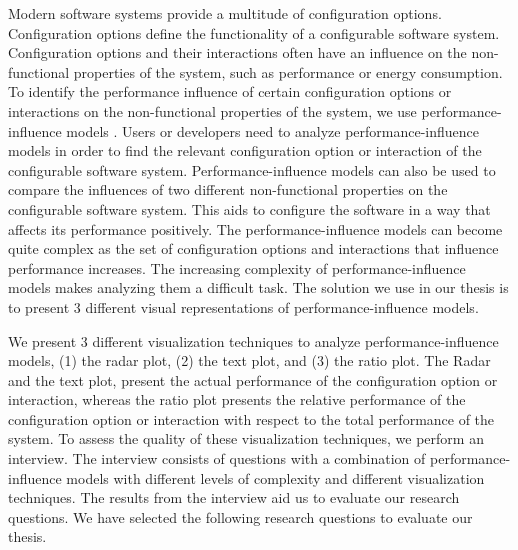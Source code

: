 
Modern software systems provide a multitude of configuration options. Configuration options define the functionality of a configurable software system. Configuration options and their interactions often have an influence on the non-functional properties of the system, such as performance or energy consumption. To identify the performance influence of certain configuration options or interactions on the non-functional properties of the system, we use performance-influence models \cite{DBLP:conf/sigsoft/SiegmundGAK15}. 
Users or developers need to analyze performance-influence models in order to find the relevant configuration option or interaction of the configurable software system. Performance-influence models can also be used to compare the influences of two different non-functional properties on the configurable software system. This aids to configure the software in a way that affects its performance positively. The performance-influence models can become quite complex as the set of configuration options and interactions that influence performance increases. The increasing complexity of performance-influence models makes analyzing them a difficult task. The solution we use in our thesis is to present 3 different visual representations of performance-influence models.

We present 3 different visualization techniques to analyze performance-influence models, (1) the radar plot,  (2) the text plot, and (3) the ratio plot. The Radar and the text plot, present the actual performance of the configuration option or interaction, whereas the ratio plot presents the relative performance of the configuration option or interaction with respect to the total performance of the system. To assess the quality of these visualization techniques, we perform an interview. The interview consists of questions with a combination of performance-influence models with different levels of complexity and different visualization techniques. The results from the interview aid us to evaluate our research questions. We have selected the following research questions to evaluate our thesis.

